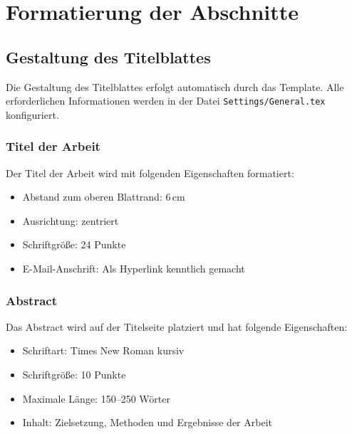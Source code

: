
\chapter{Formatierung der Abschnitte}
\label{chap:formatierung_abschnitte}

\section{Gestaltung des Titelblattes}
\label{sec:titelblatt}

Die Gestaltung des Titelblattes erfolgt automatisch durch das Template. Alle erforderlichen Informationen werden in der Datei \texttt{Settings/General.tex} konfiguriert.

\subsection*{Titel der Arbeit}
\label{subsec:titel_arbeit}

Der Titel der Arbeit wird mit folgenden Eigenschaften formatiert:
\begin{itemize}
	\item Abstand zum oberen Blattrand: 6\,cm
	\item Ausrichtung: zentriert
	\item Schriftgröße: 24 Punkte
	\item E-Mail-Anschrift: Als Hyperlink kenntlich gemacht
\end{itemize}

\subsection*{Abstract}
\label{subsec:abstract}

Das Abstract wird auf der Titelseite platziert und hat folgende Eigenschaften:
\begin{itemize}
	\item Schriftart: Times New Roman kursiv
	\item Schriftgröße: 10 Punkte
	\item Maximale Länge: 150--250 Wörter
	\item Inhalt: Zielsetzung, Methoden und Ergebnisse der Arbeit
\end{itemize}

